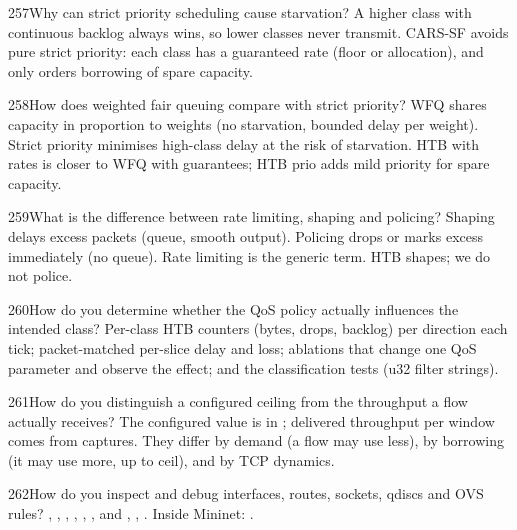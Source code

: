 \begin{qa}{257}{Why can strict priority scheduling cause starvation?}
A higher class with continuous backlog always wins, so lower classes never transmit. CARS-SF avoids pure strict
priority: each class has a guaranteed rate (floor or allocation), and  only orders borrowing of spare
capacity.
\end{qa}

\begin{qa}{258}{How does weighted fair queuing compare with strict priority?}
WFQ shares capacity in proportion to weights (no starvation, bounded delay per weight). Strict priority minimises
high-class delay at the risk of starvation. HTB with rates is closer to WFQ with guarantees; HTB prio adds mild
priority for spare capacity.
\end{qa}

\begin{qa}{259}{What is the difference between rate limiting, shaping and policing?}
Shaping delays excess packets (queue, smooth output). Policing drops or marks excess immediately (no queue). Rate
limiting is the generic term. HTB shapes; we do not police.
\end{qa}

\begin{qa}{260}{How do you determine whether the QoS policy actually influences the intended class?}
Per-class HTB counters (bytes, drops, backlog) per direction each tick; packet-matched per-slice delay and loss;
ablations that change one QoS parameter and observe the effect; and the classification tests (u32 filter strings).
\end{qa}

\begin{qa}{261}{How do you distinguish a configured ceiling from the throughput a flow actually receives?}
The configured value is in ; delivered throughput per window comes from captures. They
differ by demand (a flow may use less), by borrowing (it may use more, up to ceil), and by TCP dynamics.
\end{qa}

\begin{qa}{262}{How do you inspect and debug interfaces, routes, sockets, qdiscs and OVS rules?}
, , , ,
, ,  and
, , . Inside Mininet: .
\end{qa}

